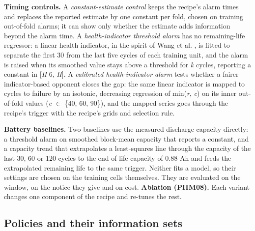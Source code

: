 \documentclass[a4paper,fleqn,doubleblind]{cas-dc}
\begin{document}
\textbf{Timing controls.} A \textit{constant-estimate control} keeps the recipe's alarm times and replaces the reported estimate by one constant per fold, chosen on training out-of-fold alarms; it can show only whether the estimate adds information beyond the alarm time. A \textit{health-indicator threshold alarm} has no remaining-life regressor: a linear health indicator, in the spirit of Wang et al. \cite{wang2008}, is fitted to separate the first 30 from the last five cycles of each training unit, and the alarm is raised when its smoothed value stays above a threshold for \textit{k} cycles, reporting a constant in [\textit{H} \textminus{} 6, \textit{H}]. A \textit{calibrated health-indicator alarm} tests whether a fairer indicator-based opponent closes the gap: the same linear indicator is mapped to cycles to failure by an isotonic, decreasing regression of min(\textit{r}, \textit{c}) on its inner out-of-fold values (\textit{c} $\in$ \{40, 60, 90\}), and the mapped series goes through the recipe's trigger with the recipe's grids and selection rule.

\textbf{Battery baselines.} Two baselines use the measured discharge capacity directly: a threshold alarm on smoothed block-mean capacity that reports a constant, and a capacity trend that extrapolates a least-squares line through the capacity of the last 30, 60 or 120 cycles to the end-of-life capacity of 0.88 Ah and feeds the extrapolated remaining life to the same trigger. Neither fits a model, so their settings are chosen on the training cells themselves. They are evaluated on the window, on the notice they give and on cost. \textbf{Ablation (PHM08).} Each variant changes one component of the recipe and re-tunes the rest.

\subsection{Policies and their information sets}
\end{document}

